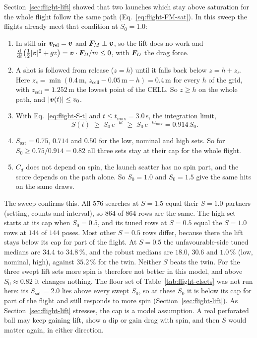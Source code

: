 Section~\ref{sec:flight-lift} showed that two launches which stay above saturation for the whole flight follow
the same path (Eq.~\eqref{eq:flight-FM-sat}). In this sweep the flights already meet that condition at
$S_0=1.0$:
\begin{enumerate}
  \item In still air $\bm{v}_{\mathrm{rel}}=\bm{v}$ and $\bm{F}_M\perp\bm{v}$, so the lift does no
    work and $\frac{\mathrm{d}}{\mathrm{d}t}\bigl(\tfrac12|\bm{v}|^2+gz\bigr)=\bm{v}\cdot\bm{F}_D/m\le0$,
    with $\bm{F}_D$ the drag force.
  \item A shot is followed from release ($z=h$) until it falls back below $z=h+z_s$. Here
    $z_s=\min(0.4\,\text{m},\,z_{\text{cell}}-0.05\,\text{m}-h)=0.4$\,\unit{m}\derived{} for every $h$ of the
    grid, with $z_{\text{cell}}=1.252$\,\unit{m}\derived{} the lowest point of the CELL. So $z\ge h$ on the whole
    path, and $|\bm{v}(t)|\le v_0$.
  \item With Eq.~\eqref{eq:flight-S-t} and $t\le t_{\max}=3.0$\,\unit{s}\assumed, the integration limit,
    \begin{equation}
      S(t)\;\ge\;S_0\,e^{-kt}\;\ge\;S_0\,e^{-kt_{\max}}=0.914\,S_0.
      \label{eq:svt-bound}
    \end{equation}
  \item $S_{\mathrm{sat}}=0.75$\derived, $0.714$\derived{} and $0.50$\derived{} for the low, nominal and high
    sets. So for $S_0\ge0.75/0.914=0.82$\derived{} all three sets stay at their cap for the whole flight.
  \item $C_d$ does not depend on spin, the launch scatter has no spin part, and the score depends on the path
    alone. So $S_0=1.0$ and $S_0=1.5$ give the same hits on the same draws.
\end{enumerate}
The sweep confirms this. All $576$\derived{} searches at $S=1.5$ equal their $S=1.0$ partners (setting, counts
and interval), so $864$\derived{} of $864$ rows are the same. The high set starts at its cap when $S_0=0.5$,
and its tuned rows at $S=0.5$ equal the $S=1.0$ rows at $144$\derived{} of $144$ poses. Most other $S=0.5$ rows
differ, because there the lift stays below its cap for part of the flight. At $S=0.5$ the unfavourable-side
tuned medians are $34.4$\predicted{} to $34.8\,\%$\predicted, and the robust medians are $18.0$\predicted,
$30.6$\predicted{} and $1.0\,\%$\predicted{} (low, nominal, high), against $35.2\,\%$\predicted{} for the
twin. Neither $S$ beats the twin. For the three swept lift sets
more spin is therefore not better in this model, and above $S_0\approx0.82$\derived{} it changes nothing. The
floor set of Table~\ref{tab:flight-clsets} was not run here: its $S_{\mathrm{sat}}=2.0$\derived{} lies above
every swept $S_0$, so at these $S_0$ it is below its cap for part of the flight and still responds to more
spin (Section~\ref{sec:flight-lift}). As
Section~\ref{sec:flight-lift} stresses, the cap is a model assumption. A real perforated ball may keep gaining
lift, show a dip or gain drag with spin, and then $S$ would matter again, in either direction.

